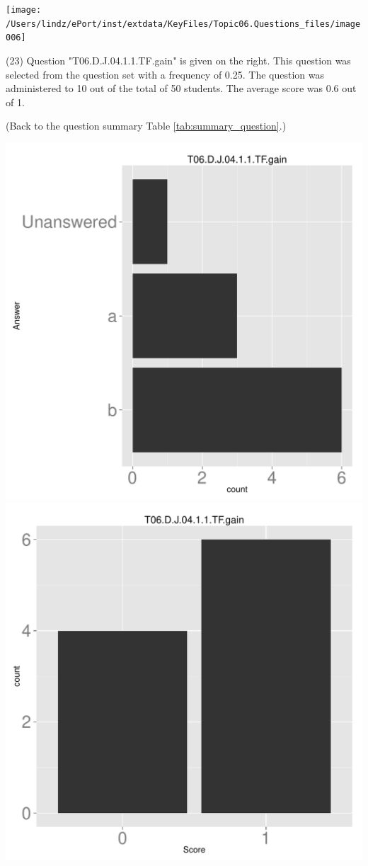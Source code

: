 \documentclass[12pt,english,nohyper]{tufte-handout}\usepackage[]{graphicx}\usepackage[]{color}
\begin{document}
\vspace{5cm}\begin{marginfigure}\texttt{[image: /Users/lindz/ePort/inst/extdata/KeyFiles/Topic06.Questions\_files/image006]}\end{marginfigure}\vspace{-5cm} (23) Question "T06.D.J.04.1.1.TF.gain" is given on the right. This question was selected from the question set with a frequency of 0.25. The question was administered to 10 out of the total of 50 students. The average score was 0.6 out of 1.

 (Back to the question summary Table \ref{tab:summary_question}.)

\begin{center} \includegraphics[width=.45\linewidth]{Topic06_AB_23_answer} \includegraphics[width=.45\linewidth]{Topic06_AB_23_score} \end{center} 
\end{document}
